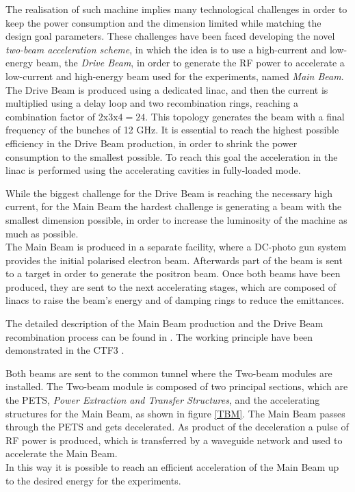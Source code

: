 The realisation of such machine implies many technological challenges in order to keep the power consumption and the dimension limited while matching the design goal parameters. These challenges have been faced developing the novel \textit{two-beam acceleration scheme}, in which the idea is to use a high-current and low-energy beam, the \textit{Drive Beam}, in order to generate the RF power to accelerate a low-current and high-energy beam used for the experiments, named \textit{Main Beam}. \\
The Drive Beam is produced using a dedicated linac, and then the current is multiplied using a delay loop and two recombination rings, reaching a combination factor of $2\text{x}3\text{x}4=24$. This topology generates the beam with a final frequency of the bunches of 12 GHz. It is essential to reach the highest possible efficiency in the Drive Beam production, in order to shrink the power consumption to the smallest possible. To reach this goal the acceleration in the linac is performed using the accelerating cavities in fully-loaded mode.\cite{Corsini:791372}

While the biggest challenge for the Drive Beam is reaching the necessary high current, for the Main Beam the hardest challenge is generating a beam with the smallest dimension possible, in order to increase the luminosity of the machine as much as possible.\\
The Main Beam is produced in a separate facility, where a DC-photo gun system provides the initial polarised electron beam. Afterwards part of the beam is sent to a target in order to generate the positron beam. Once both beams have been produced, they are sent to the next accelerating stages, which are composed of linacs to raise the beam's energy and of damping rings to reduce the emittances. 

The detailed description of the Main Beam production and the Drive Beam recombination process can be found in \cite{CLIC:cdr}. The working principle have been demonstrated in the CTF3 \cite{CTF:drive_beam}. 

Both beams are sent to the common tunnel where the Two-beam modules are installed. The Two-beam module is composed of two principal sections, which are the PETS, \textit{Power Extraction and Transfer Structures}, and the accelerating structures for the Main Beam, as shown in figure \ref{TBM}. The Main Beam passes through the PETS and gets decelerated. As product of the deceleration a pulse of RF power is produced, which is transferred by a waveguide network and used to accelerate the Main Beam.\\ In this way it is possible to reach an efficient acceleration of the Main Beam up to the desired energy for the experiments.

